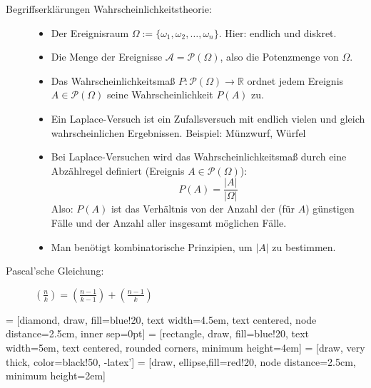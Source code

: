 \begin{description}
  \item [Begriffserklärungen Wahrscheinlichkeitstheorie:]
    \begin{itemize}
      \item Der Ereignisraum $\Omega := \{\omega_1,\omega_2,\dots,\omega_n\}$. 
            Hier: endlich und diskret.
      \item Die Menge der Ereignisse $\mathcal{A} = \mathcal{P}(\Omega)$, also 
            die Potenzmenge von $\Omega$.
      \item Das Wahrscheinlichkeitsmaß 
            $P : \mathcal{P}(\Omega) \rightarrow \mathbb{R}$ ordnet jedem 
            Ereignis $A \in \mathcal{P}(\Omega)$ seine Wahrscheinlichkeit $P(A)$ 
            zu.
      \item Ein Laplace-Versuch ist ein Zufallsversuch mit endlich vielen und 
            gleich wahrscheinlichen Ergebnissen. Beispiel: Münzwurf, Würfel
      \item Bei Laplace-Versuchen wird das Wahrscheinlichkeitsmaß durch eine 
            Abzählregel definiert (Ereignis $A \in \mathcal{P}(\Omega)$):
            \begin{equation*}
              P(A) = \frac{|A|}{|\Omega|}
            \end{equation*}
            Also: $P(A)$ ist das Verhältnis von der Anzahl der (für $A$) 
            günstigen Fälle und der Anzahl aller insgesamt möglichen Fälle.
      \item Man benötigt kombinatorische Prinzipien, um $|A|$ zu bestimmen.
    \end{itemize}

  \item [Pascal'sche Gleichung:]
    $(\frac{n}{k}) = (\frac{n-1}{k-1})+(\frac{n-1}{k})$
\end{description}


 = [diamond, draw, fill=blue!20,
text width=4.5em, text centered, node distance=2.5cm, inner sep=0pt]
 = [rectangle, draw, fill=blue!20,
text width=5em, text centered, rounded corners, minimum height=4em]
 = [draw, very thick, color=black!50, -latex']
 = [draw, ellipse,fill=red!20, node distance=2.5cm,
minimum height=2em]


